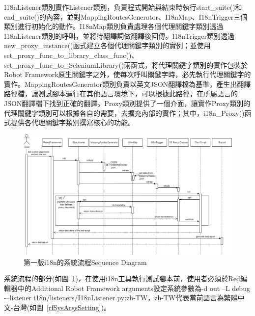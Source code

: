 I18nListener類別實作Listener類別，負責程式開始與結束時執行start\_suite()和end\_suite()的內容，並對MappingRoutesGenerator、I18nMap、I18nTrigger三個類別進行初始化的動作。I18nMap類別負責處理各個代理關鍵字類別透過I18nListener類別的呼叫，並將待翻譯詞做翻譯後回傳。I18nTrigger類別透過new\_proxy\_instance()函式建立各個代理關鍵字類別的實例；並使用set\_proxy\_func\_to\_library\_class\_func()、set\_proxy\_func\_to\_SeleniumLibrary()兩函式，將代理關鍵字類別的實作包裝於Robot Framework原生關鍵字之外，使每次呼叫關鍵字時，必先執行代理關鍵字的實作。MappingRoutesGenerator類別負責以英文JSON翻譯檔為基準，產生出翻譯路徑檔，讓測試腳本運行在其他語言環境下，可以根據此路徑，在所屬語言的JSON翻譯檔下找到正確的翻譯。Proxy類別提供了一個介面，讓實作Proxy類別的代理關鍵字類別可以根據各自的需要，去擴充內部的實作；其中，i18n\_Proxy()函式提供各代理關鍵字類別撰寫核心的功能。

\begin{figure}[H]
    \includegraphics[width= 1.1\textwidth]{../UML/i18n sequence diagram-第一版i18n系統流程.png}
    \caption{第一版i18n的系統流程Sequence Diagram}
    \label{1stI18nSequenceDiagram}
\end{figure}
系統流程的部分(如圖~\ref{1stI18nSequenceDiagram})，在使用i18n工具執行測試腳本前，使用者必須於Red編輯器\cite{red}中的Additional Robot Framework arguments設定系統參數為-d out –L debug -–listener i18n/listeners/I18nListener.py:zh-TW，zh-TW代表當前語言為繁體中文-台灣(如圖~\ref{rfSysArgsSetting})。

